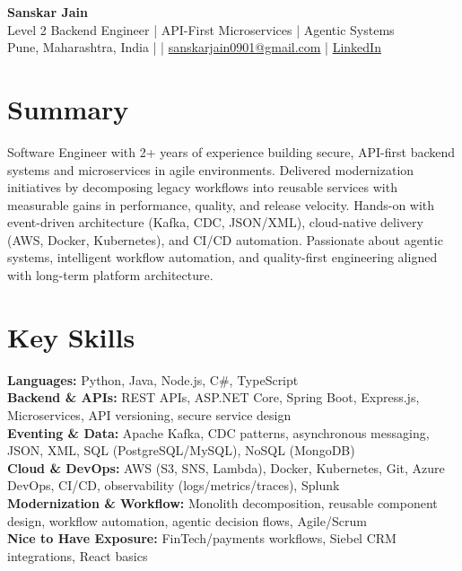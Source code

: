 \documentclass[10pt,letterpaper]{article}
\begin{document}
\begin{center}
    {\Large \textbf{Sanskar Jain}} \\
    Level 2 Backend Engineer | API-First Microservices | Agentic Systems \\
    Pune, Maharashtra, India \enspace |  \enspace | \enspace
    \href{mailto:sanskarjain0901@gmail.com}{sanskarjain0901@gmail.com} \enspace | \enspace
    \href{https://www.linkedin.com/in/sanskar-jain0901/}{LinkedIn}
\end{center}

\section*{Summary}
Software Engineer with 2+ years of experience building secure, API-first backend systems and microservices in agile environments. Delivered modernization initiatives by decomposing legacy workflows into reusable services with measurable gains in performance, quality, and release velocity. Hands-on with event-driven architecture (Kafka, CDC, JSON/XML), cloud-native delivery (AWS, Docker, Kubernetes), and CI/CD automation. Passionate about agentic systems, intelligent workflow automation, and quality-first engineering aligned with long-term platform architecture.

\section*{Key Skills}
\textbf{Languages:} Python, Java, Node.js, C\#, TypeScript \\
\textbf{Backend \& APIs:} REST APIs, ASP.NET Core, Spring Boot, Express.js, Microservices, API versioning, secure service design \\
\textbf{Eventing \& Data:} Apache Kafka, CDC patterns, asynchronous messaging, JSON, XML, SQL (PostgreSQL/MySQL), NoSQL (MongoDB) \\
\textbf{Cloud \& DevOps:} AWS (S3, SNS, Lambda), Docker, Kubernetes, Git, Azure DevOps, CI/CD, observability (logs/metrics/traces), Splunk \\
\textbf{Modernization \& Workflow:} Monolith decomposition, reusable component design, workflow automation, agentic decision flows, Agile/Scrum \\
\textbf{Nice to Have Exposure:} FinTech/payments workflows, Siebel CRM integrations, React basics
\end{document}
